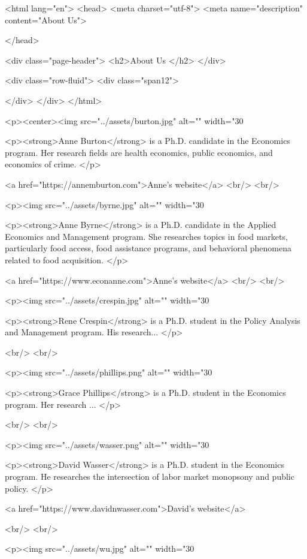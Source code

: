 <html lang="en">
  <head>
    <meta charset="utf-8">
    <meta name="description" content="About Us">
  
  </head>

        

<div class="page-header">
  <h2>About Us </h2>
</div>

<div class="row-fluid">
  <div class="span12">
  
  </div>
</div>
</html>
        
 <p><center><img src="../assets/burton.jpg" alt="" width="30%

<p><strong>Anne Burton</strong> is a Ph.D. candidate in the Economics program. Her research fields are health economics, public economics, and economics of crime. </p>

<a href="https://annemburton.com">Anne's website</a>
    <br/>
    <br/>
    
<p><img src="../assets/byrne.jpg" alt="" width="30%

 <p><strong>Anne Byrne</strong> is a Ph.D. candidate in the Applied Economics and Management program. She researches topics in food markets, particularly food access, food assistance programs, and behavioral phenomena related to food acquisition. </p>

    <a href="https://www.econanne.com">Anne's website</a>
    <br/>
    <br/>

<p><img src="../assets/crespin.jpg" alt="" width="30%

<p><strong>Rene Crespin</strong> is a Ph.D. student in the Policy Analysis and Management program. His research... </p>

<br/>
<br/>

<p><img src="../assets/phillips.png" alt="" width="30%

<p><strong>Grace Phillips</strong> is a Ph.D. student in the Economics program. Her research ... </p>

<br/>
<br/>

<p><img src="../assets/wasser.png" alt="" width="30%

<p><strong>David Wasser</strong> is a Ph.D. student in the Economics program. He researches the intersection of labor market monopsony and public policy. </p>

<a href="https://www.davidnwasser.com">David's website</a>

<br/>
<br/>

<p><img src="../assets/wu.jpg" alt="" width="30%

